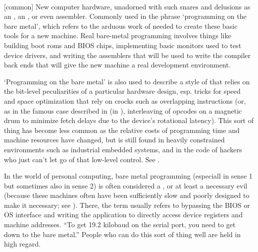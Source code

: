 \ 

\begin{inparaenum}
    \item {[}common] New computer hardware, unadorned with such snares and
        delusions as an , an , or
        even assembler. Commonly used in the phrase `programming on the bare
        metal', which refers to the arduous work of 
        needed to create these basic tools for a new machine. Real bare-metal
        programming involves things like building boot roms and BIOS chips,
        implementing basic monitors used to test device drivers, and writing the
        assemblers that will be used to write the compiler back ends that will
        give the new machine a real development environment.
    \item `Programming on the bare metal' is also used to describe a style of
         that relies on the bit-level peculiarities of a
        particular hardware design, esp. tricks for speed and space optimization
        that rely on crocks such as overlapping instructions (or, as in the
        famous case described in  (in
        ), interleaving of opcodes on a magnetic drum to
        minimize fetch delays due to the device's rotational latency). This sort
        of thing has become less common as the relative costs of programming
        time and machine resources have changed, but is still found in heavily
        constrained environments such as industrial embedded systems, and in the
        code of hackers who just can't let go of that low-level control. See
        .
\end{inparaenum}

In the world of personal computing, bare metal programming (especiall in sense 1
but sometimes also in sense 2) is often considered a , or
at least a necessary evil (because these machines often have been sufficiently
slow and poorly designed to make it necessary; see ).
There, the term usually refers to bypassing the BIOS or OS interface and writing
the application to directly access device registers and machine addresses. ``To
get 19.2 kilobaud on the serial port, you need to get down to the bare metal.''
People who can do this sort of thing well are held in high regard.

